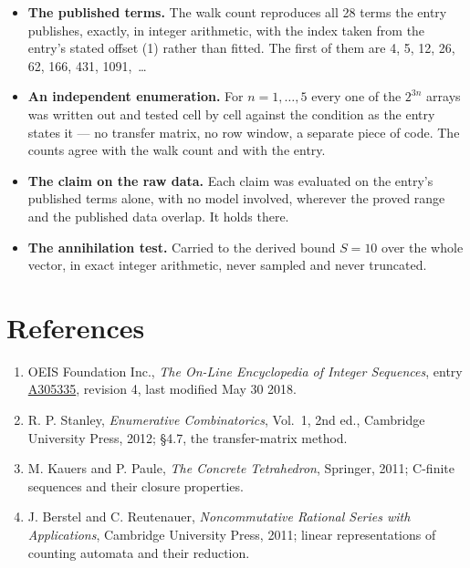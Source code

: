 \documentclass[11pt]{article}
\theoremstyle{definition}
\begin{document}
\begin{itemize}

\item {\bfseries The published terms.} The walk count reproduces all 28 terms the entry publishes, exactly, in integer arithmetic, with the index taken from the entry's stated offset (1) rather than fitted. The first of them are 4, 5, 12, 26, 62, 166, 431, 1091,~\dots

\item {\bfseries An independent enumeration.} For $n = 1,\dots,5$ every one of the $2^{3n}$ arrays was written out and tested cell by cell against the condition as the entry states it --- no transfer matrix, no row window, a separate piece of code. The counts agree with the walk count and with the entry.

\item {\bfseries The claim on the raw data.} Each claim was evaluated on the entry's published terms alone, with no model involved, wherever the proved range and the published data overlap. It holds there.

\item {\bfseries The annihilation test.} Carried to the derived bound $S = 10$ over the whole vector, in exact integer arithmetic, never sampled and never truncated.

\end{itemize}

\section{References}

\begin{enumerate}

\item OEIS Foundation Inc., \emph{The On-Line Encyclopedia of Integer Sequences}, entry \href{https://oeis.org/A305335}{A305335}, revision 4, last modified May 30 2018.

\item R. P. Stanley, \emph{Enumerative Combinatorics}, Vol.~1, 2nd ed., Cambridge University Press, 2012; \S4.7, the transfer-matrix method.

\item M. Kauers and P. Paule, \emph{The Concrete Tetrahedron}, Springer, 2011; C-finite sequences and their closure properties.

\item J. Berstel and C. Reutenauer, \emph{Noncommutative Rational Series with Applications}, Cambridge University Press, 2011; linear representations of counting automata and their reduction.

\end{enumerate}
\end{document}
